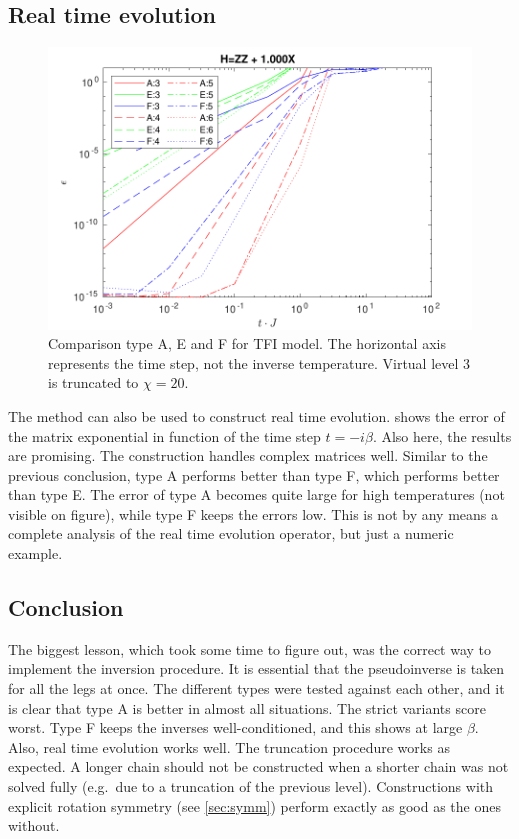\subsection{Real time evolution} \label{subsec_rt_evo}

\begin{figure}[!htbp]
  \center
  \includegraphics[width=\textwidth]{Figuren/benchmarking/1D_t_ising_time.pdf}
  \caption{Comparison type A, E and F for \Gls{TFI} model. The horizontal axis represents the time step, not the inverse temperature. Virtual level 3 is truncated to $\chi=20$.  }
  \label{fig:benchmark:tising_time}
\end{figure}

\noindent
The method can also be used to construct real time evolution.  shows the error of the matrix exponential in function of the time step $t = -i \beta $. Also here, the results are promising. The construction handles complex matrices well. Similar to the previous conclusion, type A performs better than type F, which performs better than type E. The error of type A becomes quite large for high temperatures (not visible on figure), while type F keeps the errors low. This is not by any means a complete analysis of the real time evolution operator, but just a numeric example.

\subsection{Conclusion}

The biggest lesson, which took some time to figure out, was the correct way to implement the inversion procedure. It is essential that the pseudoinverse is taken for all the legs at once. The different types were tested against each other, and it is clear that type A is better in almost all situations. The strict variants score worst. Type F keeps the inverses well-conditioned, and this shows at large $\beta$. Also, real time evolution works well. The truncation procedure works as expected. A longer chain should not be constructed when a shorter chain was not solved fully (e.g.\ due to a truncation of the previous level). Constructions with explicit rotation symmetry (see \cref{sec:symm}) perform exactly as good as the ones without.
